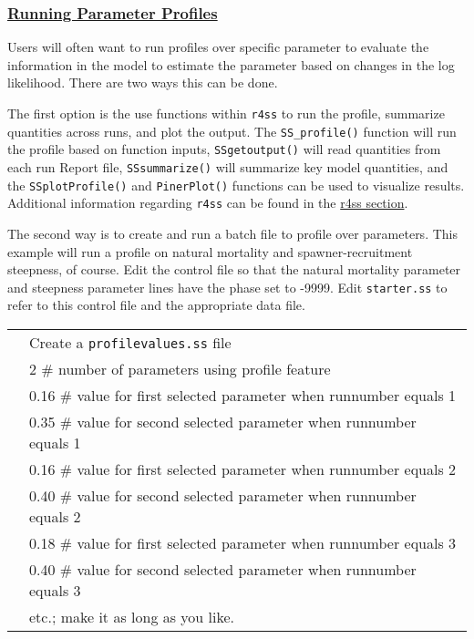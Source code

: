 \hypertarget{ParamProfiles}{}
\subsubsection[Running Parameter Profiles]{\protect\hyperlink{ParamProfiles}{Running Parameter Profiles}}
Users will often want to run profiles over specific parameter to evaluate the information in the model to estimate the parameter based on changes in the log likelihood. There are two ways this can be done.

The first option is the use functions within \texttt{r4ss} to run the profile, summarize quantities across runs, and plot the output. The \texttt{SS\_profile()} function will run the profile based on function inputs, \texttt{SSgetoutput()} will read quantities from each run Report file, \texttt{SSsummarize()} will summarize key model quantities, and the \texttt{SSplotProfile()} and \texttt{PinerPlot()} functions can be used to visualize results. Additional information regarding \texttt{r4ss} can be found in the \hyperref[sec:r4ss]{r4ss section}. 

The second way is to create and run a batch file to profile over parameters. This example will run a profile on natural mortality and spawner-recruitment steepness, of course. Edit the control file so that the natural mortality parameter and steepness parameter lines have the phase set to -9999. Edit \texttt{starter.ss} to refer to this control file and the appropriate data file.

	\begin{longtable}{p{0.5cm} p{16cm}}		
		& Create a \texttt{profilevalues.ss} file \\
		& 2	\# number of parameters using profile feature \\
		& 0.16	\# value for first selected parameter when runnumber equals 1 \\
		& 0.35	\# value for second selected parameter when runnumber equals 1 \\
		& 0.16	\# value for first selected parameter when runnumber equals 2 \\
		& 0.40	\# value for second selected parameter when runnumber equals 2 \\
		& 0.18	\# value for first selected parameter when runnumber equals 3 \\
		& 0.40	\# value for second selected parameter when runnumber equals 3 \\
		& etc.;  make it as long as you like. \\
	\end{longtable}

